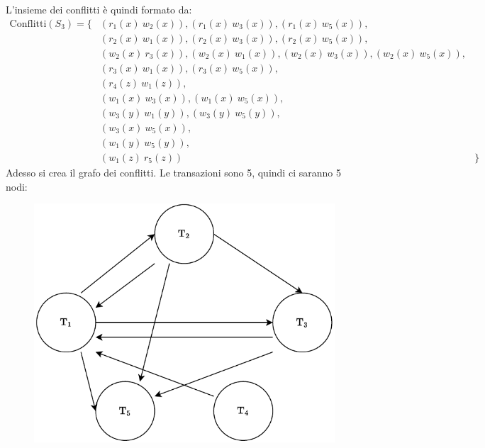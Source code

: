 \documentclass[a4paper]{article}
\begin{document}
	\noindent
	L'insieme dei conflitti è quindi formato da:
	\begin{equation*}
		\begin{array}{lll}
			\text{Conflitti}\left(S_{3}\right) = \{ & \left(r_{1}\left(x\right) \: w_{2}\left(x\right)\right), \left(r_{1}\left(x\right) \: w_{3}\left(x\right)\right), \left(r_{1}\left(x\right) \: w_{5}\left(x\right)\right), & \\[0.5em]
													& \left(r_{2}\left(x\right) \: w_{1}\left(x\right)\right), \left(r_{2}\left(x\right) \: w_{3}\left(x\right)\right), \left(r_{2}\left(x\right) \: w_{5}\left(x\right)\right), & \\[0.5em]
													& \left(w_{2}\left(x\right) \: r_{3}\left(x\right)\right), \left(w_{2}\left(x\right) \: w_{1}\left(x\right)\right), \left(w_{2}\left(x\right) \: w_{3}\left(x\right)\right), \left(w_{2}\left(x\right) \: w_{5}\left(x\right)\right), & \\[0.5em]
													& \left(r_{3}\left(x\right) \: w_{1}\left(x\right)\right), \left(r_{3}\left(x\right) \: w_{5}\left(x\right)\right), & \\[0.5em]
													& \left(r_{4}\left(z\right) \: w_{1}\left(z\right)\right), & \\[0.5em]
													& \left(w_{1}\left(x\right) \: w_{3}\left(x\right)\right), \left(w_{1}\left(x\right) \: w_{5}\left(x\right)\right), & \\[0.5em]
													& \left(w_{3}\left(y\right) \: w_{1}\left(y\right)\right), \left(w_{3}\left(y\right) \: w_{5}\left(y\right)\right), & \\[0.5em]
													& \left(w_{3}\left(x\right) \: w_{5}\left(x\right)\right), & \\[0.5em]
													& \left(w_{1}\left(y\right) \: w_{5}\left(y\right)\right), & \\[0.5em]
													& \left(w_{1}\left(z\right) \: r_{5}\left(z\right)\right) & \}
		\end{array}
	\end{equation*}
	Adesso si crea il grafo dei conflitti. Le transazioni sono 5, quindi ci saranno 5 nodi:
	\begin{figure}[!htp]
		\centering
		\includegraphics[width=.7\textwidth]{img/CSR-2.pdf}
	\end{figure}
	
\end{document}
